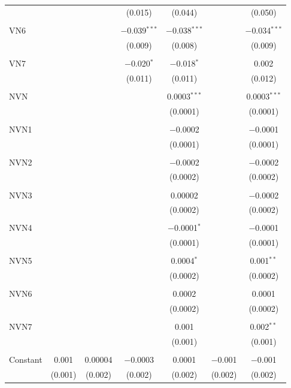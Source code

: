 \begin{table}[!htbp]
\begin{tabular}{@{\extracolsep{5pt}}lcccccc}
  &  &  & (0.015) & (0.044) &  & (0.050) \\ 
  & & & & & & \\ 
 VN6 &  &  & $-$0.039$^{***}$ & $-$0.038$^{***}$ &  & $-$0.034$^{***}$ \\ 
  &  &  & (0.009) & (0.008) &  & (0.009) \\ 
  & & & & & & \\ 
 VN7 &  &  & $-$0.020$^{*}$ & $-$0.018$^{*}$ &  & 0.002 \\ 
  &  &  & (0.011) & (0.011) &  & (0.012) \\ 
  & & & & & & \\ 
 NVN &  &  &  & 0.0003$^{***}$ &  & 0.0003$^{***}$ \\ 
  &  &  &  & (0.0001) &  & (0.0001) \\ 
  & & & & & & \\ 
 NVN1 &  &  &  & $-$0.0002 &  & $-$0.0001 \\ 
  &  &  &  & (0.0001) &  & (0.0001) \\ 
  & & & & & & \\ 
 NVN2 &  &  &  & $-$0.0002 &  & $-$0.0002 \\ 
  &  &  &  & (0.0002) &  & (0.0002) \\ 
  & & & & & & \\ 
 NVN3 &  &  &  & 0.00002 &  & $-$0.0002 \\ 
  &  &  &  & (0.0002) &  & (0.0002) \\ 
  & & & & & & \\ 
 NVN4 &  &  &  & $-$0.0001$^{*}$ &  & $-$0.0001 \\ 
  &  &  &  & (0.0001) &  & (0.0001) \\ 
  & & & & & & \\ 
 NVN5 &  &  &  & 0.0004$^{*}$ &  & 0.001$^{**}$ \\ 
  &  &  &  & (0.0002) &  & (0.0002) \\ 
  & & & & & & \\ 
 NVN6 &  &  &  & 0.0002 &  & 0.0001 \\ 
  &  &  &  & (0.0002) &  & (0.0002) \\ 
  & & & & & & \\ 
 NVN7 &  &  &  & 0.001 &  & 0.002$^{**}$ \\ 
  &  &  &  & (0.001) &  & (0.001) \\ 
  & & & & & & \\ 
 Constant & 0.001 & 0.00004 & $-$0.0003 & 0.0001 & $-$0.001 & $-$0.001 \\ 
  & (0.001) & (0.002) & (0.002) & (0.002) & (0.002) & (0.002) \\ 

\end{tabular}
\end{table}
